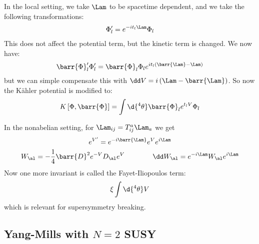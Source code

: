 \documentclass{booc}
\begin{document}
In the local setting, we take $\Lam$ to be spacetime dependent, 
and we take the following transformations:
\begin{align}
\Phi_l' = e^{-it_l \Lam} \Phi_l
\end{align}
This does not affect the potential term, but the kinetic term is changed. 
We now have:
\begin{equation}
\barr{\Phi}'_l \Phi'_l = 
\barr{\Phi}_l\Phi_l e^{it_l \left( \barr{\Lam} - \Lam \right)}
\end{equation}
but we can simple compensate this with $\dd V = i\left( \Lam - \barr{\Lam} \right)$.
So now the K\"ahler potential is modified to:
\begin{equation}
K\left[ \Phi , \barr{\Phi} \right] = \int \d{^4\theta} \barr{\Phi}_l
e^{t_l V}\Phi_l
\end{equation}

In the nonabelian setting, for $\Lam_{ij} = T_{ij}^a \Lam_a$ we get
\begin{gather}
e^{V'} = e^{-i \barr{\Lam}} e^V e^{i\Lam} \\
W_\al = -\frac{1}{4} \barr{D}^2 e^{-V} D_\al e^V 
\qquad\qquad
\dd W_\al = e^{-i\Lam} W_\al e^{i\Lam}
\end{gather}
Now one more invariant is called the Fayet-Iliopoulos term:
\begin{equation}
\xi\int \d{^4 \theta} V
\end{equation}
which is relevant for supersymmetry breaking.


\subsection{Yang-Mills with $N = 2$ SUSY}
\end{document}
